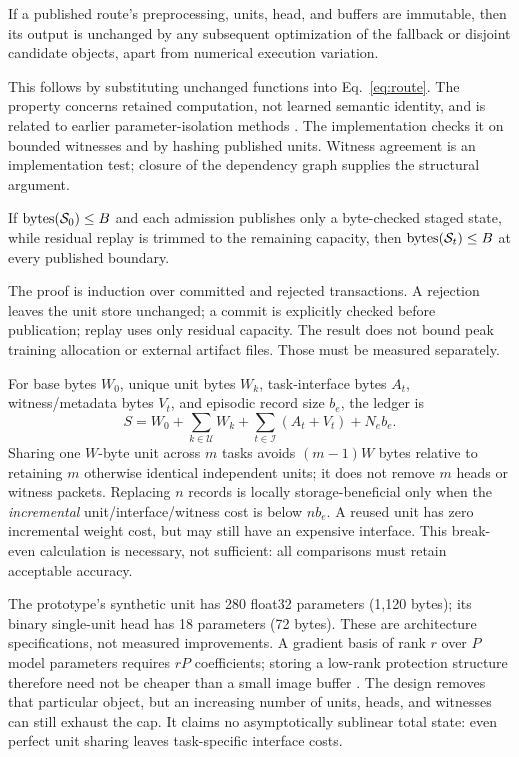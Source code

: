 \documentclass{article}
\begin{document}
\begin{proposition}
If a published route's preprocessing, units, head, and buffers are immutable, then its output is unchanged by any subsequent optimization of the fallback or disjoint candidate objects, apart from numerical execution variation.
\end{proposition}
This follows by substituting unchanged functions into Eq.~\eqref{eq:route}. The property concerns retained computation, not learned semantic identity, and is related to earlier parameter-isolation methods \cite{rusu2016,mallya2018}. The implementation checks it on bounded witnesses and by hashing published units. Witness agreement is an implementation test; closure of the dependency graph supplies the structural argument.

\begin{proposition}
If $\operatorname{bytes}(\mathcal S_0)\le B$ and each admission publishes only a byte-checked staged state, while residual replay is trimmed to the remaining capacity, then $\operatorname{bytes}(\mathcal S_t)\le B$ at every published boundary.
\end{proposition}
The proof is induction over committed and rejected transactions. A rejection leaves the unit store unchanged; a commit is explicitly checked before publication; replay uses only residual capacity. The result does not bound peak training allocation or external artifact files. Those must be measured separately.

For base bytes $W_0$, unique unit bytes $W_k$, task-interface bytes $A_t$, witness/metadata bytes $V_t$, and episodic record size $b_e$, the ledger is
\begin{equation}
S=W_0+\sum_{k\in\mathcal U}W_k+\sum_{t\in\mathcal I}(A_t+V_t)+N_e b_e.
\label{eq:ledger}
\end{equation}
Sharing one $W$-byte unit across $m$ tasks avoids $(m-1)W$ bytes relative to retaining $m$ otherwise identical independent units; it does not remove $m$ heads or witness packets. Replacing $n$ records is locally storage-beneficial only when the \emph{incremental} unit/interface/witness cost is below $n b_e$. A reused unit has zero incremental weight cost, but may still have an expensive interface. This break-even calculation is necessary, not sufficient: all comparisons must retain acceptable accuracy.

The prototype's synthetic unit has 280 float32 parameters (1,120 bytes); its binary single-unit head has 18 parameters (72 bytes). These are architecture specifications, not measured improvements. A gradient basis of rank $r$ over $P$ model parameters requires $rP$ coefficients; storing a low-rank protection structure therefore need not be cheaper than a small image buffer \cite{farajtabar2020}. The design removes that particular object, but an increasing number of units, heads, and witnesses can still exhaust the cap. It claims no asymptotically sublinear total state: even perfect unit sharing leaves task-specific interface costs.
\end{document}
